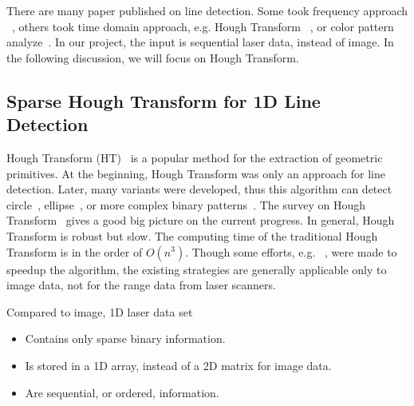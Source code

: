 \documentclass{cdcarta4}
\begin{document}
There are many paper published on line detection. Some took frequency approach ~\cite{HuaLineFitting}, others took time domain approach, e.g. Hough Transform ~\cite{HoughSurvey}, or color pattern analyze~\cite{Jan00model}. In our project, the input is sequential laser data, instead of image. In the following discussion, we will focus on Hough Transform.

    \subsection{Sparse Hough Transform for 1D Line Detection}

Hough Transform (HT)~\cite{HoughSurvey}\cite{Atherton99CHT}
is a popular method for the extraction of geometric primitives. At the beginning, Hough Transform was only an approach for line detection. Later, many variants were developed, thus this algorithm can detect circle~\cite{Atherton99CHT}, ellipse~\cite{guil97lower}, or more complex binary patterns~\cite{guil96new}. The survey on Hough Transform~\cite{HoughSurvey} gives a good big picture on the current progress. In general, Hough Transform is robust but slow. The computing time of the traditional Hough Transform is in the order of $O(n^3)$. Though some efforts, e.g. ~\cite{matas98progressive}, were made to speedup the algorithm, the existing strategies are generally applicable only to image data, not for the range data from laser scanners. 

Compared to image, 1D laser data set
\begin{itemize}
    \item Contains only sparse binary information.
    \item Is stored in a 1D array, instead of a 2D matrix for image data.
    \item Are sequential, or ordered, information.
\end{itemize}
\end{document}
